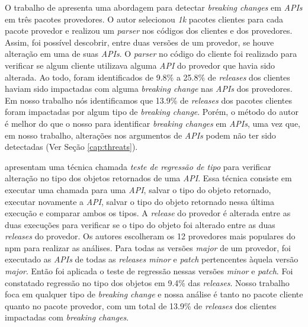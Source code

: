 O trabalho de  apresenta uma abordagem para detectar \textit{breaking changes} em \textit{APIs} em três pacotes provedores. O autor selecionou \textit{1k} pacotes clientes para cada pacote provedor e realizou um \textit{parser} nos códigos dos clientes e dos provedores. Assim, foi possível descobrir, entre duas versões de um provedor, se houve alteração em uma de suas \textit{APIs}. O \textit{parser} no código do cliente foi realizado para verificar se algum cliente utilizava alguma \textit{API} do provedor que havia sido alterada. Ao todo, foram identificados de 9.8\% a 25.8\% de \textit{releases} dos clientes haviam sido impactadas com alguma \textit{breaking change} nas \textit{APIs} dos provedores. Em nosso trabalho nós identificamos que 13.9\% de \textit{releases} dos pacotes clientes foram impactadas por algum tipo de \textit{breaking change}. Porém, o método do autor é melhor do que o nosso para identificar \textit{breaking changes} em \textit{APIs}, uma vez que, em nosso trabalho, alterações nos argumentos de \textit{APIs} podem não ter sido detectadas (Ver Seção \ref{cap:threats}).

 apresentam uma técnica chamada \textit{teste de regressão de tipo} para verificar alteração no tipo dos objetos retornados de uma \textit{API}. Essa técnica consiste em executar uma chamada para uma \textit{API}, salvar o tipo do objeto retornado, executar novamente a \textit{API}, salvar o tipo do objeto retornado nessa última execução e comparar ambos os tipos. A \textit{release} do provedor é alterada entre as duas execuções para verificar se o tipo do objeto foi alterado entre as duas \textit{releases} do provedor. Os autores escolheram os 12 provedores mais populares do \textsf{npm} para realizar as análises. Para todas as versões \textit{major} de um provedor, foi executado as \textit{APIs} de todas as \textit{releases minor} e \textit{patch} pertencentes àquela versão \textit{major}. Então foi aplicada o teste de regressão nessas versões \textit{minor} e \textit{patch}. Foi constatado regressão no tipo dos objetos em 9.4\% das \textit{releases}. Nosso trabalho foca em qualquer tipo de \textit{breaking change} e nossa análise é tanto no pacote cliente quanto no pacote provedor, com um total de 13.9\% de \textit{releases} dos clientes impactadas com \textit{breaking changes}.

